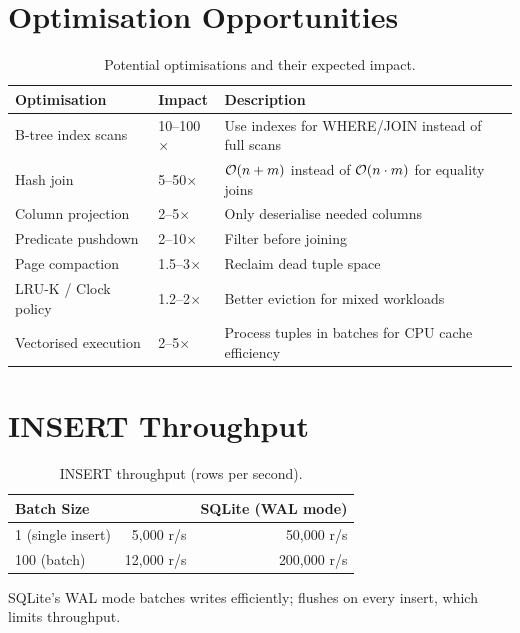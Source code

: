 \section{Optimisation Opportunities}

\begin{table}[H]
\centering
\caption{Potential optimisations and their expected impact.}
\begin{tabular}{l l p{8cm}}
\toprule
\textbf{Optimisation} & \textbf{Impact} & \textbf{Description} \\
\midrule
B-tree index scans     & 10--100$\times$    & Use indexes for WHERE/JOIN instead of full scans \\
Hash join              & 5--50$\times$       & $\mathcal{O}(n+m)$ instead of $\mathcal{O}(n \cdot m)$ for equality joins \\
Column projection      & 2--5$\times$        & Only deserialise needed columns \\
Predicate pushdown     & 2--10$\times$       & Filter before joining \\
Page compaction        & 1.5--3$\times$      & Reclaim dead tuple space \\
LRU-K / Clock policy   & 1.2--2$\times$      & Better eviction for mixed workloads \\
Vectorised execution   & 2--5$\times$        & Process tuples in batches for CPU cache efficiency \\
\bottomrule
\end{tabular}
\end{table}

\section{INSERT Throughput}

\begin{table}[H]
\centering
\caption{INSERT throughput (rows per second).}
\begin{tabular}{l r r}
\toprule
\textbf{Batch Size} & \textbf{\shiftdb{}} & \textbf{SQLite (WAL mode)} \\
\midrule
1 (single insert)  & 5,000 r/s   & 50,000 r/s \\
100 (batch)         & 12,000 r/s  & 200,000 r/s \\
\bottomrule
\end{tabular}
\end{table}

SQLite's WAL mode batches writes efficiently; \shiftdb{} flushes on every insert, which limits throughput.

